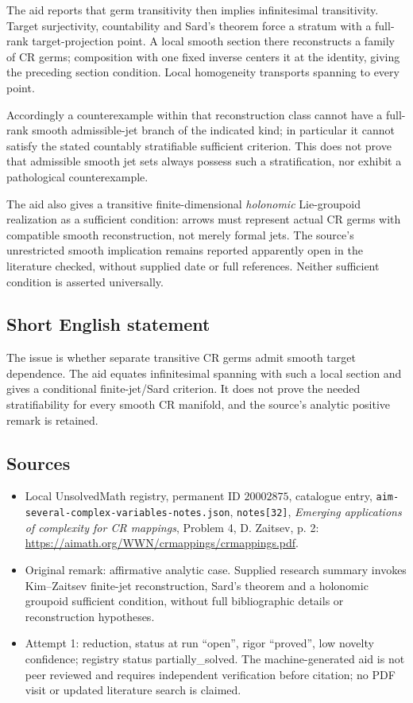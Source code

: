 \documentclass[11pt]{article}
\begin{document}
The aid reports that germ transitivity then implies infinitesimal transitivity. Target surjectivity, countability and Sard's theorem force a stratum with a full-rank target-projection point. A local smooth section there reconstructs a family of CR germs; composition with one fixed inverse centers it at the identity, giving the preceding section condition. Local homogeneity transports spanning to every point.

Accordingly a counterexample within that reconstruction class cannot have a full-rank smooth admissible-jet branch of the indicated kind; in particular it cannot satisfy the stated countably stratifiable sufficient criterion. This does not prove that admissible smooth jet sets always possess such a stratification, nor exhibit a pathological counterexample.

The aid also gives a transitive finite-dimensional \emph{holonomic} Lie-groupoid realization as a sufficient condition: arrows must represent actual CR germs with compatible smooth reconstruction, not merely formal jets. The source's unrestricted smooth implication remains reported apparently open in the literature checked, without supplied date or full references. Neither sufficient condition is asserted universally.
\subsection{Short English statement}
The issue is whether separate transitive CR germs admit smooth target dependence. The aid equates infinitesimal spanning with such a local section and gives a conditional finite-jet/Sard criterion. It does not prove the needed stratifiability for every smooth CR manifold, and the source's analytic positive remark is retained.
\subsection{Sources}
\begin{itemize}
\item Local UnsolvedMath registry, permanent ID \(20002875\), catalogue entry, \texttt{aim-several-complex-variables-notes.json}, \texttt{notes[32]}, \emph{Emerging applications of complexity for CR mappings}, Problem 4, D. Zaitsev, p. 2: \url{https://aimath.org/WWN/crmappings/crmappings.pdf}.
\item Original remark: affirmative analytic case. Supplied research summary invokes Kim--Zaitsev finite-jet reconstruction, Sard's theorem and a holonomic groupoid sufficient condition, without full bibliographic details or reconstruction hypotheses.
\item Attempt 1: reduction, status at run ``open'', rigor ``proved'', low novelty confidence; registry status partially\_solved. The machine-generated aid is not peer reviewed and requires independent verification before citation; no PDF visit or updated literature search is claimed.
\end{itemize}
\end{document}
